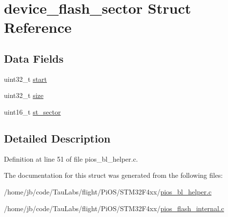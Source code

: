 \hypertarget{structdevice__flash__sector}{\section{device\-\_\-flash\-\_\-sector \-Struct \-Reference}
\label{structdevice__flash__sector}
}
\subsection*{\-Data \-Fields}
\begin{DoxyCompactItemize}
\item 
uint32\-\_\-t \hyperlink{group___p_i_o_s___b_o_o_t_l_o_a_d_e_r_ga8efbeb4ac8f39002737374387a063360}{start}
\item 
uint32\-\_\-t \hyperlink{group___p_i_o_s___b_o_o_t_l_o_a_d_e_r_ga53bfb33fe9a388542e57e8314108fd0a}{size}
\item 
uint16\-\_\-t \hyperlink{group___p_i_o_s___b_o_o_t_l_o_a_d_e_r_gaf71821c5c2fdb240c7d27d8371b38fbd}{st\-\_\-sector}
\end{DoxyCompactItemize}


\subsection{\-Detailed \-Description}


\-Definition at line 51 of file pios\-\_\-bl\-\_\-helper.\-c.



\-The documentation for this struct was generated from the following files\-:\begin{DoxyCompactItemize}
\item 
/home/jb/code/\-Tau\-Labs/flight/\-Pi\-O\-S/\-S\-T\-M32\-F4xx/\hyperlink{_s_t_m32_f4xx_2pios__bl__helper_8c}{pios\-\_\-bl\-\_\-helper.\-c}\item 
/home/jb/code/\-Tau\-Labs/flight/\-Pi\-O\-S/\-S\-T\-M32\-F4xx/\hyperlink{_s_t_m32_f4xx_2pios__flash__internal_8c}{pios\-\_\-flash\-\_\-internal.\-c}\end{DoxyCompactItemize}
